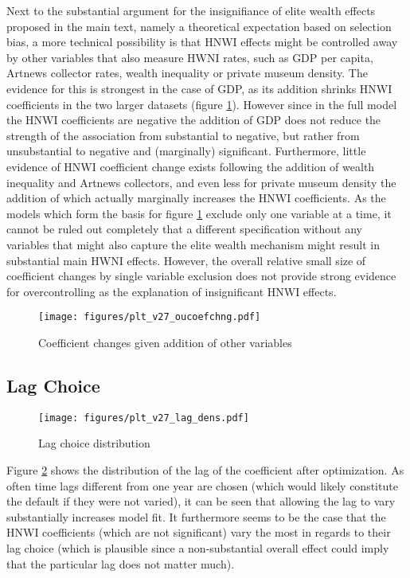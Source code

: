 \documentclass[11pt]{article}
\begin{document}
Next to the substantial argument for the insignifiance of elite wealth effects proposed in the main text, namely a theoretical expectation based on selection bias, a more technical possibility is that HNWI effects might be controlled away by other variables that also measure HWNI rates, such as GDP per capita, Artnews collector rates, wealth inequality or private museum density.
The evidence for this is strongest in the case of GDP, as its addition shrinks HNWI coefficients in the two larger datasets (figure \ref{fig:oucoefchng}).
However since in the full model the HNWI coefficients are negative the addition of GDP does not reduce the strength of the association from substantial to negative, but rather from unsubstantial to negative and (marginally) significant. 
Furthermore, little evidence of HNWI coefficient change exists following the addition of wealth inequality and Artnews collectors, and even less for private museum density the addition of which actually marginally increases the HNWI coefficients.
As the models which form the basis for figure \ref{fig:oucoefchng} exclude only one variable at a time, it cannot be ruled out completely that a different specification without any variables that might also capture the elite wealth mechanism might result in substantial main HWNI effects.
However, the overall relative small size of coefficient changes by single variable exclusion does not provide strong evidence for overcontrolling as the explanation of insignificant HNWI effects. 


\begin{landscape}

\begin{figure}[htbp]
\centering
\texttt{[image: figures/plt\_v27\_oucoefchng.pdf]}
\caption{\label{fig:oucoefchng}Coefficient changes given addition of other variables}
\end{figure}

\end{landscape}




\subsection{Lag Choice}
\label{app_lagchoice}
\begin{figure}[htbp]
\centering
\texttt{[image: figures/plt\_v27\_lag\_dens.pdf]}
\caption{\label{fig:lag_dens}Lag choice distribution}
\end{figure}

Figure \ref{fig:lag_dens} shows the distribution of the lag of the coefficient after optimization.
As often time lags different from one year are chosen (which would likely constitute the default if they were not varied), it can be seen that allowing the lag to vary substantially increases model fit. 
It furthermore seems to be the case that the HNWI coefficients (which are not significant) vary the most in regards to their lag choice (which is plausible since a non-substantial overall effect could imply that the particular lag does not matter much). 
\end{document}
